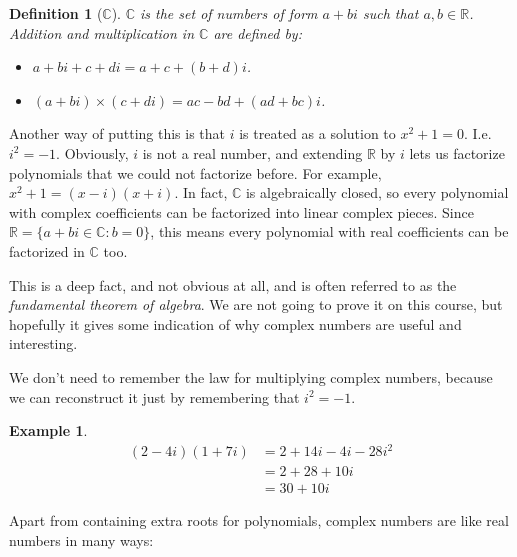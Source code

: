 \documentclass{article}
\theoremstyle{plain}
\newtheorem{definition}[theorem]{Definition}{\bfseries}{\upshape}
\newtheorem{example}[theorem]{Example}{\bfseries}{\upshape}
\newcommand{\bC}{\mathbb{C}}
\newcommand{\bR}{\mathbb{R}}
\begin{document}
\begin{definition}[$\bC$]
$\bC$ is the set of numbers of form $a +bi$ such that $a,b\in\bR$. Addition and multiplication in $\bC$ are defined by:
\begin{itemize}
\item $a + bi + c + di = a+c + (b+d)i$.
\item $(a+bi)\times(c+di) = ac - bd +(ad+bc)i$. 
\end{itemize}
\end{definition}

Another way of putting this is that $i$ is treated as a solution to $x^2+1 = 0$. I.e. $i^2 = -1$. Obviously, $i$ is not a real number, and extending $\bR$ by $i$ lets us factorize polynomials that we could not factorize before. For example, $x^2+1 = (x-i)(x+i)$. In fact, $\bC$ is algebraically closed, so every polynomial with complex coefficients can be factorized into linear complex pieces. Since $\bR = \{a+ bi \in \bC: b = 0\}$, this means every polynomial with real coefficients can be factorized in $\bC$ too. 

This is a deep fact, and not obvious at all, and is often referred to as the \emph{fundamental theorem of algebra}. We are not going to prove it on this course, but hopefully it gives some indication of why complex numbers are useful and interesting.

We don't need to remember the law for multiplying complex numbers, because we can reconstruct it just by remembering that $i^2 = -1$.
\begin{example}
\begin{align*}
(2-4i)(1+7i) &= 2 +14i -4i -28i^2 \\
&= 2 + 28 +10i \\
&= 30 + 10i 
\end{align*}
\end{example}

Apart from containing extra roots for polynomials, complex numbers are like real numbers in many ways:
\end{document}

